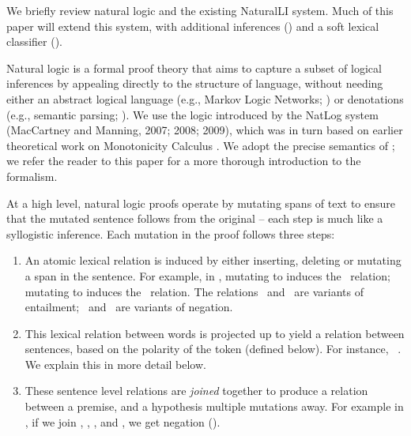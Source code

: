 We briefly review natural logic and the existing NaturalLI system.
Much of this paper will extend this system, with additional inferences
  () and a soft lexical classifier ().

Natural logic is a formal proof theory that 
  aims to capture a subset of logical
  inferences by appealing directly to the structure of language,
  without needing either an abstract logical language 
  (e.g., Markov Logic Networks; )
  or denotations (e.g., semantic parsing; ).
We use the logic
  introduced by the NatLog system (MacCartney and Manning, 2007; 2008; 2009),
  \nocite{key:2007maccartney-natlog}
  \nocite{key:2008maccartney-natlog}
  \nocite{key:2009maccartney-natlog} %
  which was in turn
  based on earlier theoretical work on Monotonicity Calculus
  \cite{key:1986benthem-natlog,key:1991valencia-natlog}.
We adopt the precise semantics of ;
  we refer the reader to this paper for a more thorough introduction to
  the formalism.

At a high level, natural logic proofs operate by mutating spans of text
  to ensure that the mutated sentence follows from the
  original -- each step is much like a syllogistic inference.
Each mutation in the proof follows three steps:

\begin{enumerate}
\setlength\itemsep{-0.25em}
\item An atomic lexical relation is induced by either inserting, deleting
      or mutating a span in the sentence. 
      For example, in ,
      mutating  to  induces the \negate\ relation;
      mutating  to  induces the \forward\ relation.
      The relations \equivalent\ and \forward\ are variants of  entailment;
      \negate\ and \alternate\ are variants of negation.

\item This lexical relation between words is projected up to yield a relation between
      sentences, based on the polarity of the token (defined below).
      For instance,  \forward\ .
      We explain this in more detail below.

\item These sentence level relations are \textit{joined} together to produce a
      relation between a premise, and a hypothesis multiple mutations away.
      For example in , if we join 
      \forward, \equivalent, \forward, and \negate, we
      get negation (\alternate).
\end{enumerate}

